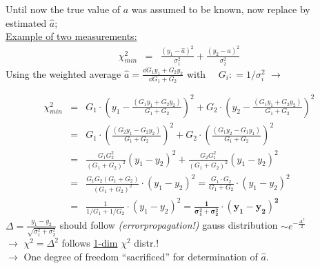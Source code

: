 \begin{slide}
\Large
\pagestyle{headings}
\sf
{}
%
Until now the true value of $a$ was assumed to be known, 
now replace by estimated $\hat{a}$;\\[2mm]
\underline{Example of two measurements:}
\begin{eqnarray*} 
\chi^2_{min} & = & 
\frac{ (y_1 - \hat{a})^2 } {\sigma_1^2} 
+
\frac{ (y_2 - \hat{a})^2 } {\sigma_2^2}
\end{eqnarray*}
Using  the weighted average 
$\hat{a} = \frac{\dd G_1 y_1 + G_2 y_2}{\dd G_1+G_2}$ with $ \quad G_i: = 1/\sigma_i^2$ $\rightarrow$  
\end{slide}


\begin{slide}
\Large
\pagestyle{headings}
\sf
{}
%
\vspace{-5mm}
\normalsize
\begin{eqnarray*}
\chi^2_{min} & = &   
  G_1 \cdot \left(y_1 - \frac{(G_1 y_1 + G_2 y_2)}{G_1+G_2} \right)^2 
+ G_2 \cdot \left(y_2 - \frac{(G_1 y_1 + G_2 y_2)}{G_1+G_2} \right)^2 \\
& = & 
  G_1 \cdot \left(\frac{(G_2 y_1 - G_2 y_2)}{G_1+G_2} \right)^2 
+ G_2 \cdot \left(\frac{(G_1 y_2 - G_1 y_1)}{G_1+G_2} \right)^2 \\
& = & 
\frac{G_1 G_2^2}{(G_1+G_2)^2} (y_1 -y_2)^2 + 
\frac{G_2 G_1^2}{(G_1+G_2)^2} (y_1 -y_2)^2 \\
& = & 
\frac{G_1 G_2 (G_1+G_2)}{(G_1+G_2)^2} \cdot  (y_1 -y_2)^2 
 =  \frac{G_1 \cdot G_2}{G_1+G_2} \cdot (y_1-y_2)^2\\ 
& = & 
\frac{1}{1/G_1 + 1/G_2} \cdot (y_1 - y_2)^2 
 = {  \pmb{  \frac{1}{\sigma_1^2+\sigma_2^2} \cdot 
(y_1-y_2)^2}} 
\end{eqnarray*}
\Large 
$\Delta = 
\frac{y_1 - y_2}{\sqrt{\sigma_1^2 +\sigma_2^2}}$ should follow
{\blue  \small \it (errorpropagation!)} 
gauss distribution $\sim e^{-\frac{\Delta^2}{2}}$\\[1mm]
$ \rightarrow$ $\chi^2 = \Delta^2$ follows \underline{1-dim} $\chi^2$
distr.!\\[1mm]
$\rightarrow$ One degree of freedom ``sacrificed'' for determination of
$\hat{a}$.\\[2mm]
\end{slide}


